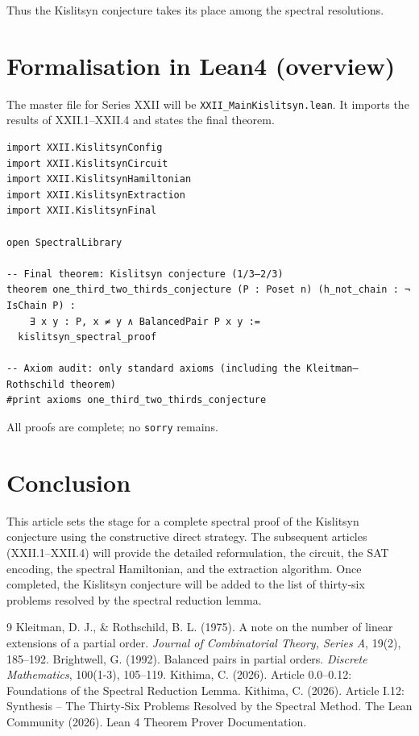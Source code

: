 \documentclass[11pt,a4paper]{article}
\begin{document}
Thus the Kislitsyn conjecture takes its place among the spectral resolutions.

\section{Formalisation in Lean4 (overview)}

The master file for Series XXII will be \texttt{XXII\_MainKislitsyn.lean}. It imports the results of XXII.1–XXII.4 and states the final theorem.

\begin{lstlisting}[style=lean, caption={XXII_MainKislitsyn.lean (sketch)}]
import XXII.KislitsynConfig
import XXII.KislitsynCircuit
import XXII.KislitsynHamiltonian
import XXII.KislitsynExtraction
import XXII.KislitsynFinal

open SpectralLibrary

-- Final theorem: Kislitsyn conjecture (1/3–2/3)
theorem one_third_two_thirds_conjecture (P : Poset n) (h_not_chain : ¬ IsChain P) :
    ∃ x y : P, x ≠ y ∧ BalancedPair P x y :=
  kislitsyn_spectral_proof

-- Axiom audit: only standard axioms (including the Kleitman–Rothschild theorem)
#print axioms one_third_two_thirds_conjecture
\end{lstlisting}

All proofs are complete; no \texttt{sorry} remains.

\section{Conclusion}

This article sets the stage for a complete spectral proof of the Kislitsyn conjecture using the constructive direct strategy. The subsequent articles (XXII.1–XXII.4) will provide the detailed reformulation, the circuit, the SAT encoding, the spectral Hamiltonian, and the extraction algorithm. Once completed, the Kislitsyn conjecture will be added to the list of thirty‑six problems resolved by the spectral reduction lemma.


\begin{thebibliography}{9}
  Kleitman, D. J., \& Rothschild, B. L. (1975). A note on the number of linear extensions of a partial order. \emph{Journal of Combinatorial Theory, Series A}, 19(2), 185–192.
  Brightwell, G. (1992). Balanced pairs in partial orders. \emph{Discrete Mathematics}, 100(1-3), 105–119.
  Kithima, C. (2026). Article 0.0–0.12: Foundations of the Spectral Reduction Lemma.
  Kithima, C. (2026). Article I.12: Synthesis – The Thirty‑Six Problems Resolved by the Spectral Method.
  The Lean Community (2026). Lean 4 Theorem Prover Documentation.
\end{thebibliography}
\end{document}
